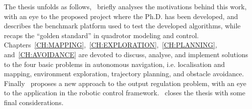 The thesis unfolds as follows,~ briefly analyses the motivations behind this work, with an eye to
the proposed project where the Ph.D. has been developed, and describes the benchmark platform used to test the developed
algorithms, while~ recaps the ``golden standard'' in quadrotor modeling and control.
Chapters~\ref{CH:MAPPING},~\ref{CH:EXPLORATION},~\ref{CH:PLANNING}, and~\ref{CH:AVOIDANCE} are devoted to
discuss, analyse, and implement solutions to the four basic problems in autonomous navigation, i.e.
localisation and mapping, environment exploration, trajectory planning, and obstacle avoidance.
Finally~ proposes a new approach to the output regulation problem, with an eye
to the application in the robotic control framework.~ closes the thesis with some
final considerations.

